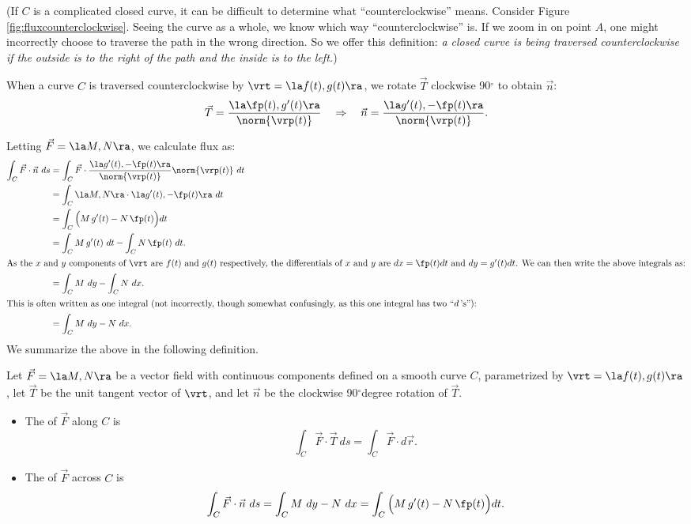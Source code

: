 (If $C$ is a complicated closed curve, it can be difficult to determine what ``counterclockwise'' means. Consider Figure \ref{fig:fluxcounterclockwise}. Seeing the curve as a whole, we know which way ``counterclockwise'' is. If we zoom in on point $A$, one might incorrectly choose to traverse the path in the wrong direction. So we offer this definition: \textit{a closed curve is being traversed counterclockwise if the outside is to the right of the path and the inside is to the left.})

When a curve $C$ is traversed counterclockwise by $\vrt = \la f(t), g(t)\ra$, we rotate $\vec T$ clockwise 90$^\circ$  to obtain $\vec n$:
$$\vec T = \frac{\la \fp(t),g'(t)\ra}{\norm{\vrp(t)}} \quad \Rightarrow \quad \vec n = \frac{\la g'(t),-\fp(t)\ra}{\norm{\vrp(t)}}.$$

Letting $\vec F = \la M, N\ra$, we calculate flux as:
\begin{align*}
\int_C \vec F\cdot \vec n\ ds &= \int_C \vec F\cdot \frac{\la g'(t),-\fp(t)\ra}{\norm{\vrp(t)}} \norm{\vrp(t)}\ dt \\
				&= \int_C \la M, N\ra \cdot \la g'(t),-\fp(t)\ra\ dt \\
				&= \int_C \Big(M\,g'(t) - N\,\fp(t)\Big)dt\\
				&= \int_C M\,g'(t)\ dt - \int_C N\,\fp(t)\ dt.\\
				\intertext{As the $x$ and $y$ components of $\vrt$ are $f(t)$ and $g(t)$ respectively, the differentials of $x$ and $y$ are $dx = \fp(t)dt$ and $dy=g'(t)dt$. We can then write the above integrals as:}
				&= \int_C M\ dy - \int_C N\ dx.\\
				\intertext{This is often written as one integral (not incorrectly, though somewhat confusingly, as this one integral has two ``$d$\,'s''):}
				&=\int_CM\ dy -N\ dx.
\end{align*}
We summarize the above in the following definition.

{Let $\vec F=\la M,N\ra$ be a vector field with continuous components defined on a smooth curve $C$, parametrized by $\vrt =\la f(t),g(t)\ra$, let $\vec T$ be the unit tangent vector of $\vrt$, and let $\vec n$ be the clockwise 90$^\circ$degree rotation of $\vec T$.
\begin{itemize}
	\item The  of $\vec F$ along $C$ is
$$\int_C \vec F\cdot\vec T\ ds=\int_C \vec F\cdot d\vec r.$$
	\item The  of $\vec F$ across $C$ is
$$\int_C \vec F\cdot \vec n\ ds =  \int_C M\ dy -N\ dx = \int_C\Big(M\,g'(t) - N\,\fp(t)\Big)dt. $$
\end{itemize}
}

